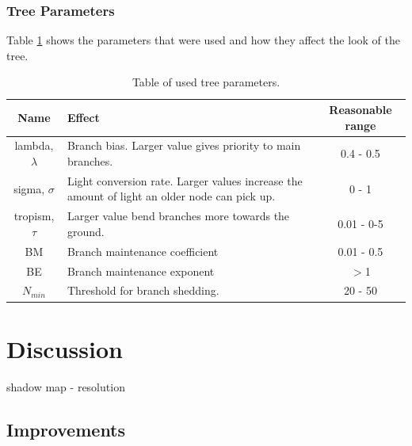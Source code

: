 \documentclass{article}
\begin{document}
  		\subsubsection*{Tree Parameters}
  		
  		Table \ref{table:param} shows the parameters that were used and how they affect the look of the tree.
  		
  		\begin{table} [!h]
  			\begin{center}
  				\begin{tabular}{ | c | m{5cm} | c | } 
  					\hline
  					Name & Effect & Reasonable range \\
  					\hline
  					\hline
  					lambda, $\lambda$ & Branch bias. Larger value gives priority to main branches. & 0.4 - 0.5 \\ 
  					\hline
  					sigma, $\sigma$ & Light conversion rate. Larger values increase the amount of light an older node can pick up. & 0 - 1\\ 
  					\hline
  					tropism, $\tau$ & Larger value bend branches more towards the ground. & 0.01 - 0-5 \\ 
  					\hline
  					BM & Branch maintenance coefficient & 0.01 - 0.5 \\ 
  					\hline
  					BE & Branch maintenance exponent &  $>$1\\ 
  					\hline
  					$N_{min}$ & Threshold for branch shedding. & 20 - 50 \\ 
  					\hline
  				\end{tabular}
  				\caption{Table of used tree parameters.}
  				\label{table:param}
  			\end{center}
  		\end{table}
  		
  	\section{Discussion}
  		
  		
  		
  		
  		
  		
  		
  		
  		shadow map - resolution
  		
  	\subsection{Improvements}

	\newpage
	
	{}
	
\end{document}
